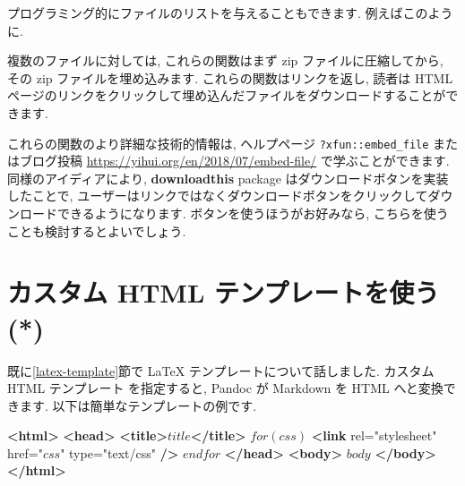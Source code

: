 \documentclass[
  11pt,
  lualatex,
  ja=standard]{bxjsreport}
\newenvironment{Shaded}{\begin{snugshade}}{\end{snugshade}}
\newcommand{\CommentTok}[1]{\textcolor[rgb]{0.56,0.35,0.01}{\textit{#1}}}
\newcommand{\FunctionTok}[1]{\textcolor[rgb]{0.00,0.00,0.00}{#1}}
\newcommand{\KeywordTok}[1]{\textcolor[rgb]{0.13,0.29,0.53}{\textbf{#1}}}
\newcommand{\NormalTok}[1]{#1}
\newcommand{\OtherTok}[1]{\textcolor[rgb]{0.56,0.35,0.01}{#1}}
\newcommand{\SpecialCharTok}[1]{\textcolor[rgb]{0.00,0.00,0.00}{#1}}
\newcommand{\StringTok}[1]{\textcolor[rgb]{0.31,0.60,0.02}{#1}}
\begin{document}
プログラミング的にファイルのリストを与えることもできます. 例えばこのように.

\begin{Shaded}
\end{Shaded}

複数のファイルに対しては, これらの関数はまず zip ファイルに圧縮してから, その zip ファイルを埋め込みます. これらの関数はリンクを返し, 読者は HTML ページのリンクをクリックして埋め込んだファイルをダウンロードすることができます.

これらの関数のより詳細な技術的情報は, ヘルプページ \texttt{?xfun::embed\_file} またはブログ投稿 \url{https://yihui.org/en/2018/07/embed-file/} で学ぶことができます. 同様のアイディアにより, \textbf{downloadthis} package \autocite{R-downloadthis} はダウンロードボタンを実装したことで, ユーザーはリンクではなくダウンロードボタンをクリックしてダウンロードできるようになります. ボタンを使うほうがお好みなら, こちらを使うことも検討するとよいでしょう.

\hypertarget{html-template}{%
\section{カスタム HTML テンプレートを使う (*)}\label{html-template}}

既に\ref{latex-template}節で LaTeX テンプレートについて話しました. カスタム HTML テンプレート を指定すると, Pandoc が Markdown を HTML へと変換できます. 以下は簡単なテンプレートの例です.

\begin{Shaded}
\begin{Highlighting}[]
\KeywordTok{\textless{}html\textgreater{}}
  \KeywordTok{\textless{}head\textgreater{}}
    \KeywordTok{\textless{}title\textgreater{}}\NormalTok{$title$}\KeywordTok{\textless{}/title\textgreater{}}
\NormalTok{    $for(css)$}
    \KeywordTok{\textless{}link}\OtherTok{ rel=}\StringTok{"stylesheet"}\OtherTok{ href=}\StringTok{"$css$"}\OtherTok{ type=}\StringTok{"text/css"} \KeywordTok{/\textgreater{}}
\NormalTok{    $endfor$}
  \KeywordTok{\textless{}/head\textgreater{}}
  \KeywordTok{\textless{}body\textgreater{}}
\NormalTok{  $body$}
  \KeywordTok{\textless{}/body\textgreater{}}
\KeywordTok{\textless{}/html\textgreater{}}
\end{Highlighting}
\end{Shaded}
\end{document}
